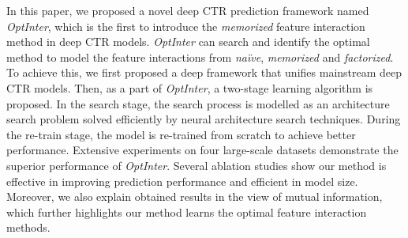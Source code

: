 \documentclass[conference]{IEEEtran}
\begin{document}
In this paper, we proposed a novel deep CTR prediction framework named \textit{OptInter}, which is the first to introduce the \emph{memorized} feature interaction method in deep CTR models. \textit{OptInter} can search and identify the optimal method to model the feature interactions from \emph{naïve}, \emph{memorized} and \emph{factorized}. To achieve this, we first proposed a deep framework that unifies mainstream deep CTR models. Then, as a part of \textit{OptInter}, a two-stage learning algorithm is proposed. In the search stage, the search process is modelled as an architecture search problem solved efficiently by neural architecture search techniques. During the re-train stage, the model is re-trained from scratch to achieve better performance. Extensive experiments on four large-scale datasets demonstrate the superior performance of \textit{OptInter}. Several ablation studies show our method is effective in improving prediction performance and efficient in model size. Moreover, we also explain obtained results in the view of mutual information, which further highlights our method learns the optimal feature interaction methods.
 
\clearpage


\end{document}
